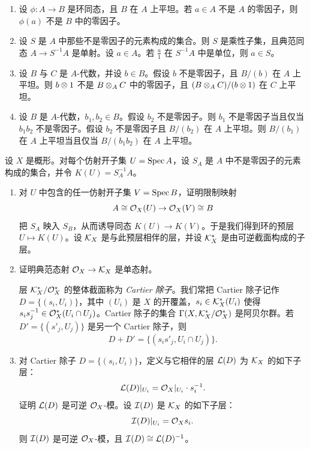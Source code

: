 \begin{exercises}
\item \label{ex:2.3.1}
\begin{enumerate}[label=(\arabic*),leftmargin=2.4em]
  \item 设 $\phi\colon A\to B$ 是环同态，且 $B$ 在 $A$ 上平坦。若 $a\in A$ 不是 $A$ 的零因子，则 $\phi(a)$ 不是 $B$ 中的零因子。
  \item 设 $S$ 是 $A$ 中那些不是零因子的元素构成的集合。则 $S$ 是乘性子集，且典范同态 $A\to S^{-1}A$ 是单射。设 $a\in A$。若 $\frac{a}{1}$ 在 $S^{-1}A$ 中是单位，则 $a\in S$。
  \item 设 $B$ 与 $C$ 是 $A$-代数，并设 $b\in B$。假设 $b$ 不是零因子，且 $B/(b)$ 在 $A$ 上平坦。则 $b\otimes 1$ 不是 $B\otimes_A C$ 中的零因子，且 $(B\otimes_A C)/(b\otimes 1)$ 在 $C$ 上平坦。
  \item 设 $B$ 是 $A$-代数，$b_1,b_2\in B$。假设 $b_2$ 不是零因子。则 $b_1$ 不是零因子当且仅当 $b_1b_2$ 不是零因子。假设 $b_2$ 不是零因子且 $B/(b_2)$ 在 $A$ 上平坦。则 $B/(b_1)$ 在 $A$ 上平坦当且仅当 $B/(b_1b_2)$ 在 $A$ 上平坦。
\end{enumerate}

\item \label{ex:2.3.2} 设 $X$ 是概形。对每个仿射开子集 $U=\operatorname{Spec} A$，设 $S_A$ 是 $A$ 中不是零因子的元素构成的集合，并令 $K(U)=S_A^{-1}A$。
\begin{enumerate}[label=(\arabic*),leftmargin=2.4em]
  \item 对 $U$ 中包含的任一仿射开子集 $V=\operatorname{Spec} B$，证明限制映射
  \[
  A\cong\mathcal{O}_X(U)\to\mathcal{O}_X(V)\cong B
  \]
  把 $S_A$ 映入 $S_B$，从而诱导同态 $K(U)\to K(V)$。于是我们得到环的预层 $U\mapsto K(U)$。设 $\mathcal{K}_X$ 是与此预层相伴的层，并设 $\mathcal{K}_X^{*}$ 是由可逆截面构成的子层。
  \item 证明典范态射 $\mathcal{O}_X\to\mathcal{K}_X$ 是单态射。

  层 $\mathcal{K}_X^{*}/\mathcal{O}_X^{*}$ 的整体截面称为 \emph{Cartier 除子}。我们常把 Cartier 除子记作 $D=\{(s_i,U_i)\}$，其中 $(U_i)$ 是 $X$ 的开覆盖，$s_i\in\mathcal{K}_X^{*}(U_i)$ 使得 $s_is_j^{-1}\in\mathcal{O}_X^{*}(U_i\cap U_j)$。Cartier 除子的集合 $\Gamma(X,\mathcal{K}_X^{*}/\mathcal{O}_X^{*})$ 是阿贝尔群。若 $D'=\{(s'_j,U_j)\}$ 是另一个 Cartier 除子，则
  \[
  D+D'=\{(s_is'_j,U_i\cap U_j)\}.
  \]

  \item 对 Cartier 除子 $D=\{(s_i,U_i)\}$，定义与它相伴的层 $\mathcal{L}(D)$ 为 $\mathcal{K}_X$ 的如下子层：
  \[
  \mathcal{L}(D)|_{U_i}=\mathcal{O}_X|_{U_i}\cdot s_i^{-1}.
  \]
  证明 $\mathcal{L}(D)$ 是可逆 $\mathcal{O}_X$-模。设 $\mathcal{I}(D)$ 是 $\mathcal{K}_X$ 的如下子层：
  \[
  \mathcal{I}(D)|_{U_i}=\mathcal{O}_X s_i.
  \]
  则 $\mathcal{I}(D)$ 是可逆 $\mathcal{O}_X$-模，且 $\mathcal{I}(D)\cong\mathcal{L}(D)^{-1}$。


\end{enumerate}
\end{exercises}
